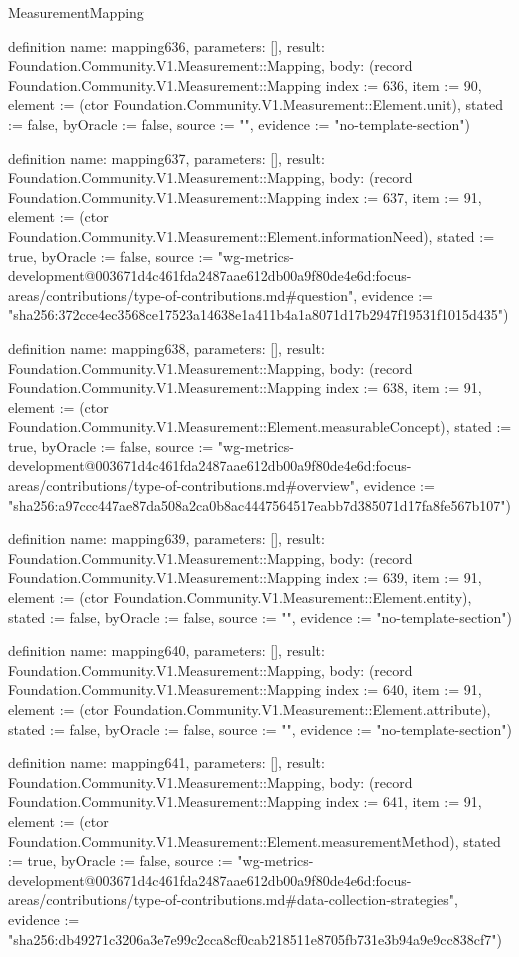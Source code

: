 \begin{lexlean}{MeasurementMapping}
\begin{semanticmodule}
definition{
  name: mapping636,
  parameters: [],
  result: Foundation.Community.V1.Measurement::Mapping,
  body: (record Foundation.Community.V1.Measurement::Mapping {index := 636, item := 90, element := (ctor Foundation.Community.V1.Measurement::Element.unit), stated := false, byOracle := false, source := "", evidence := "no-template-section"})
}

definition{
  name: mapping637,
  parameters: [],
  result: Foundation.Community.V1.Measurement::Mapping,
  body: (record Foundation.Community.V1.Measurement::Mapping {index := 637, item := 91, element := (ctor Foundation.Community.V1.Measurement::Element.informationNeed), stated := true, byOracle := false, source := "wg-metrics-development@003671d4c461fda2487aae612db00a9f80de4e6d:focus-areas/contributions/type-of-contributions.md#question", evidence := "sha256:372cce4ec3568ce17523a14638e1a411b4a1a8071d17b2947f19531f1015d435"})
}

definition{
  name: mapping638,
  parameters: [],
  result: Foundation.Community.V1.Measurement::Mapping,
  body: (record Foundation.Community.V1.Measurement::Mapping {index := 638, item := 91, element := (ctor Foundation.Community.V1.Measurement::Element.measurableConcept), stated := true, byOracle := false, source := "wg-metrics-development@003671d4c461fda2487aae612db00a9f80de4e6d:focus-areas/contributions/type-of-contributions.md#overview", evidence := "sha256:a97ccc447ae87da508a2ca0b8ac4447564517eabb7d385071d17fa8fe567b107"})
}

definition{
  name: mapping639,
  parameters: [],
  result: Foundation.Community.V1.Measurement::Mapping,
  body: (record Foundation.Community.V1.Measurement::Mapping {index := 639, item := 91, element := (ctor Foundation.Community.V1.Measurement::Element.entity), stated := false, byOracle := false, source := "", evidence := "no-template-section"})
}

definition{
  name: mapping640,
  parameters: [],
  result: Foundation.Community.V1.Measurement::Mapping,
  body: (record Foundation.Community.V1.Measurement::Mapping {index := 640, item := 91, element := (ctor Foundation.Community.V1.Measurement::Element.attribute), stated := false, byOracle := false, source := "", evidence := "no-template-section"})
}

definition{
  name: mapping641,
  parameters: [],
  result: Foundation.Community.V1.Measurement::Mapping,
  body: (record Foundation.Community.V1.Measurement::Mapping {index := 641, item := 91, element := (ctor Foundation.Community.V1.Measurement::Element.measurementMethod), stated := true, byOracle := false, source := "wg-metrics-development@003671d4c461fda2487aae612db00a9f80de4e6d:focus-areas/contributions/type-of-contributions.md#data-collection-strategies", evidence := "sha256:db49271c3206a3e7e99c2cca8cf0cab218511e8705fb731e3b94a9e9cc838cf7"})
}


\end{semanticmodule}
\end{lexlean}
